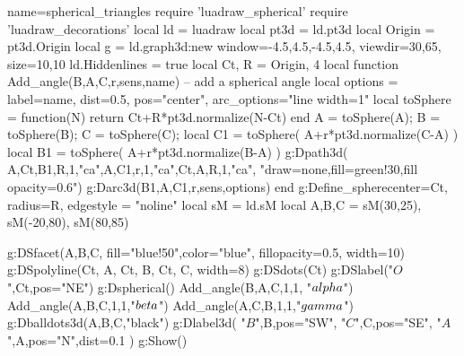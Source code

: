 \documentclass{standalone}
\begin{document}
\begin{luadraw}{name=spherical_triangles}
require 'luadraw_spherical'
require 'luadraw_decorations'
local ld = luadraw
local pt3d = ld.pt3d
local Origin = pt3d.Origin
local g = ld.graph3d:new{ window={-4.5,4.5,-4.5,4.5}, viewdir={30,65}, size={10,10} }
ld.Hiddenlines = true
local Ct, R = Origin, 4
local function Add_angle(B,A,C,r,sens,name) -- add a spherical angle
    local options = {label=name, dist=0.5, pos="center", arc_options="line width=1"}
    local toSphere = function(N) return Ct+R*pt3d.normalize(N-Ct) end
    A = toSphere(A); B = toSphere(B); C = toSphere(C); 
    local C1 = toSphere( A+r*pt3d.normalize(C-A) )
    local B1 = toSphere( A+r*pt3d.normalize(B-A) )
    g:Dpath3d( {A,Ct,B1,R,1,"ca",A,C1,r,1,"ca",Ct,A,R,1,"ca"}, "draw=none,fill=green!30,fill opacity=0.6")
    g:Darc3d(B1,A,C1,r,sens,options)
end
g:Define_sphere{center=Ct, radius=R, edgestyle = "noline"}
local sM = ld.sM
local A,B,C = sM(30,25), sM(-20,80), sM(80,85)

g:DSfacet({A,B,C}, {fill="blue!50",color="blue", fillopacity=0.5, width=10})
g:DSpolyline({{Ct, A}, {Ct, B}, {Ct, C}}, {width=8})
g:DSdots(Ct)
g:DSlabel("$O$",Ct,{pos="NE"})
g:Dspherical()
Add_angle(B,A,C,1,1, "$\\alpha$")
Add_angle(A,B,C,1,1,"$\\beta$")
Add_angle(A,C,B,1,1,"$\\gamma$")
g:Dballdots3d({A,B,C},"black")
g:Dlabel3d(
    "$B$",B,{pos="SW"},
    "$C$",C,{pos="SE"},
    "$A$",A,{pos="N",dist=0.1}
)
g:Show()
\end{luadraw}
\end{document}
